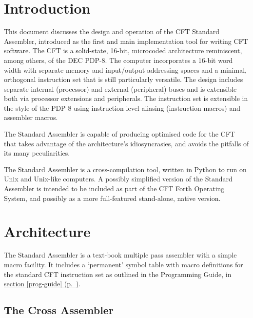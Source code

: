\documentclass[11pt,a4paper,twocolumns]{article}
\newcommand{\cf}[2][section]{\hyperref[#2]{#1 \ref*{#2} (p.~\pageref*{#2})}}
\begin{document}





\section{Introduction}

  This document discusses the design and operation of the CFT Standard
  Assembler, introduced as the first and main implementation tool for
  writing CFT software. The CFT is a solid-state, 16-bit, microcoded
  architecture reminiscent, among others, of the DEC PDP-8. The
  computer incorporates a 16-bit word width with separate memory and
  input/output addressing spaces and a minimal, orthogonal instruction
  set that is still particularly versatile. The design includes
  separate internal (processor) and external (peripheral) buses and is
  extensible both via processor extensions and peripherals. The
  instruction set is extensible in the style of the PDP-8 using
  instruction-level aliasing (instruction macros) and assembler macros.

  The Standard Assembler is capable of producing optimised code for
  the CFT that takes advantage of the architecture's idiosyncrasies,
  and avoids the pitfalls of its many peculiarities.

  The Standard Assembler is a cross-compilation tool, written in
  Python to run on Unix and Unix-like computers. A possibly simplified
  version of the Standard Assembler is intended to be included as part
  of the CFT Forth Operating System, and possibly as a more
  full-featured stand-alone, native version.

\section{Architecture}

The Standard Assembler is a text-book multiple pass assembler with a
simple macro facility. It includes a ‘permanent’ symbol table with
macro definitions for the standard CFT instruction set as outlined in
the Programming Guide, in \cf{prog-guide}.

\subsection{The Cross Assembler}
\end{document}
